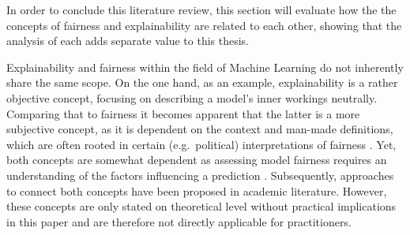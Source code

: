In order to conclude this literature review, this section will evaluate how the the concepts of fairness and explainability are related to each other, showing that the analysis of each adds separate value to this thesis.

Explainability and fairness within the field of Machine Learning do not inherently share the same scope. On the one hand, as an example, explainability is a rather objective concept, focusing on describing a model's inner workings neutrally. 
Comparing that to fairness it becomes apparent that the latter is a more subjective concept, as it is dependent on the context and man-made definitions, which are often rooted in certain (e.g.\ political) interpretations of fairness \parencite{Deepak2021}.
Yet, both concepts are somewhat dependent as assessing model fairness requires an understanding of the factors influencing a prediction \parencite{Zhou2022}.
Subsequently, approaches to connect both concepts have been proposed in academic literature. 
However, these concepts are only stated on theoretical level without practical implications in this paper and are therefore not directly applicable for practitioners.





